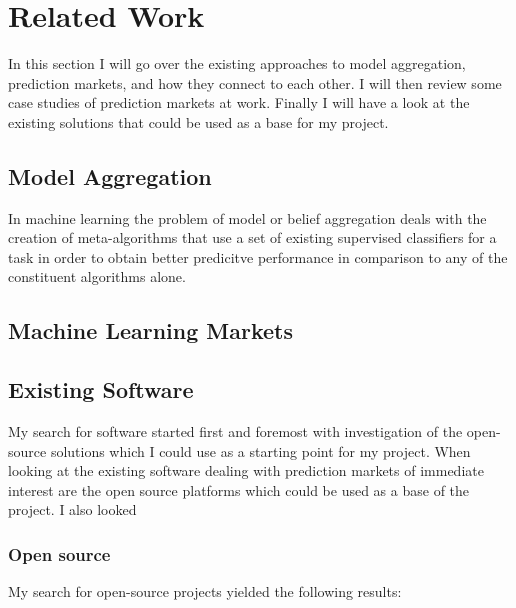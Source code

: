 \documentclass[bsc,frontabs,twoside,singlespacing,parskip,deptreport]{infthesis}     %
\begin{document}
\chapter{Related Work}

	In this section I will go over the existing approaches to model aggregation, prediction markets, and how they connect to each other. I will then review some case studies of prediction markets at work. Finally I will have a look at the existing solutions that could be used as a base for my project. 

\section{Model Aggregation}
	In machine learning the problem of model or belief aggregation deals with the creation of meta-algorithms that use a set of existing supervised classifiers for a task in order to obtain better predicitve performance in comparison to any of the constituent algorithms alone. 

\section{Machine Learning Markets}

\section{Existing Software}
% 
	My search for software started first and foremost with  investigation of the open-source solutions which I could use as a starting point for my project. 
	When looking at the existing software dealing with prediction markets of immediate interest are the open source platforms which could be used as a base of the project. I also looked 

\subsection{Open source}
	My search for open-source projects yielded the following results:
\end{document}
